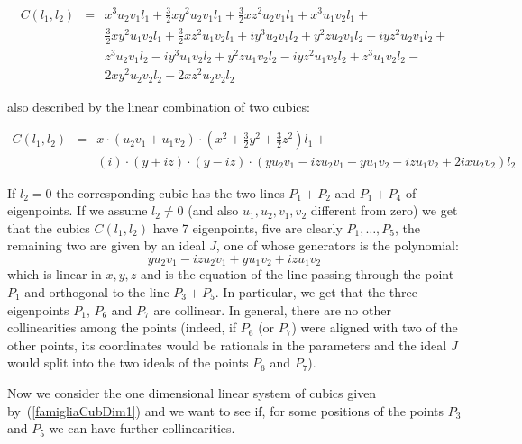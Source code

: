 \documentclass[12pt, a4paper, reqno, captions=tableheading,bibliography=totoc]{scrartcl}
\theoremstyle{plain}
\theoremstyle{definition}
\newcommand{\imunit}{i}
\begin{document}
\begin{eqnarray*}
  C(l_1, l_2) & = & x^{3} u_{2} v_{1} l_{1} + \frac{3}{2} x y^{2} u_{2} v_{1} l_{1} +
  \frac{3}{2} x z^{2} u_{2} v_{1} l_{1} + x^{3} u_{1} v_{2} l_{1} + \\
  & & \frac{3}{2} x y^{2} u_{1} v_{2} l_{1} + \frac{3}{2} x z^{2} u_{1} v_{2} l_{1} + \imunit y^{3} u_{2} v_{1} l_{2} + y^{2} z u_{2} v_{1} l_{2} +
  \imunit y z^{2} u_{2} v_{1} l_{2} + \\
  & & z^{3} u_{2} v_{1} l_{2} - \imunit y^{3} u_{1} v_{2} l_{2} + y^{2} z u_{1} v_{2} l_{2} -  \imunit y z^{2} u_{1} v_{2} l_{2} + z^{3} u_{1} v_{2} l_{2} - \\
  & & 2 x y^{2} u_{2} v_{2} l_{2} - 2 x z^{2} u_{2} v_{2} l_{2}
  \end{eqnarray*}

also described by the linear combination of two cubics:

\begin{eqnarray}
  C(l_1, l_2) & = & x \cdot (u_{2} v_{1} + u_{1} v_{2}) \cdot (x^{2} + \frac{3}{2} y^{2} + \frac{3}{2} z^{2}) l_1+\\
  & &   \left(\imunit\right) \cdot (y + \imunit z) \cdot (y - \imunit z) \cdot (y u_{2} v_{1} - \imunit z u_{2} v_{1} - y u_{1} v_{2} - \imunit z u_{1} v_{2} + 2 \imunit x u_{2} v_{2})l_2  \nonumber
\label{famigliaCubDim1}
\end{eqnarray}

If $l_2=0$ the corresponding cubic has the two lines $P_1+P_2$ and $P_1+P_4$
of eigenpoints. If we assume $l_2 \not= 0$ (and also $u_1, u_2, v_1, v_2$
different from zero) we get that the cubics $C(l_1, l_2)$ have 7
eigenpoints, five are clearly $P_1, \dots, P_5$,
the remaining two are given by an ideal $J$, one of whose generators is the
polynomial:
\[
yu_2v_1 -\imunit zu_2v_1 + yu_1v_2 + \imunit zu_1v_2
\]
which is linear in $x, y, z$ and is the equation of the line passing
through the point $P_1$ and orthogonal to the line $P_3+P_5$. In particular,
we get that the three eigenpoints $P_1$, $P_6$ and $P_7$ are collinear.
In general, there are no other collinearities among the points (indeed, if
$P_6$ (or $P_7$) were aligned with two of the other points, its coordinates
would be rationals in the parameters and the ideal $J$ would split
into the two ideals of the points $P_6$ and $P_7$).


Now we consider the one dimensional linear system of cubics given
by~(\ref{famigliaCubDim1}) and we want to see if, for some positions
of the points $P_3$ and $P_5$ we can have further collinearities.
\end{document}
